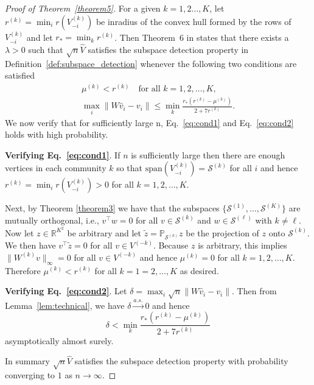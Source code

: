 \documentclass[12pt]{article}
\begin{document}
\begin{proof}[Proof of Theorem~\ref{theorem5}]
For a given $k = 1,2\dots,K$, let $r^{(k)} = \min_{i}r(V_{-i}^{(k)})$ be inradius of the convex hull formed by
the rows of $V_{-i}^{(k)}$ and let $r_* = \min_{k} r^{(k)}$. Then Theorem~6 in
\citet{jmlr-v28-wang13} states that there exists a $\lambda > 0$
such that $\sqrt{n} \hat{V}$ satisfies
the subspace detection property in
Definition~\ref{def:subspace_detection} whenever
the following two conditions are satisfied
\begin{gather}
  \label{eq:cond1}
  \mu^{(k)} < r^{(k)} \quad \text{for all $k = 1,2,\dots,K$}, \\
  \label{eq:cond2}
  \max_{i} \|W \hat{v}_{i} - v_{i}\| \leq \min_{k} \frac{r_*(r^{(k)} -
    \mu^{(k)})}{2 + 7 r^{(k)}}.
\end{gather}
We now verify that for sufficiently large n, Eq.~\eqref{eq:cond1} and Eq.~\eqref{eq:cond2}
holds with high probability.

{\bf Verifying Eq.~\eqref{eq:cond1}}. If $n$ is sufficiently large then
there are enough vertices in each community $k$ so that
$\mathrm{span}(V_{-i}^{(k)}) = \mathcal{S}^{(k)}$ for all $i$ and hence
\(r^{(k)} = \min_{i} r(V_{-i}^{(k)}) > 0\) for
all $k = 1,2,\dots,K$. 

Next, by Theorem \ref{theorem3} we have that the subspaces
$\{\mathcal{S}^{(1)}, \dots, \mathcal{S}^{(K)}\}$
are mutually orthogonal, i.e., $v^{\top} w = 0$ for all $v \in
\mathcal{S}^{(k)}$ and $w \in \mathcal{S}^{(\ell)}$ with $k \not =
\ell$. Now let $z \in \mathbb{R}^{K^2}$ be arbitrary and let
$\tilde{z} = \mathbb{P}_{\mathcal{S}^{(k)}} z$ be the projection of
$z$ onto $\mathcal{S}^{(k)}$. We then have $v^{\top} \tilde{z} =
0$ for all $v \in V^{(-k)}$. Because $z$ is arbitrary, this implies 
$\|W^{(k)} v\|_{\infty} = 0$ for all $v
\in V^{(-k)}$ and hence $\mu^{(k)} = 0$ for all $k
=1,2,\dots,K$. Therefore $\mu^{(k)} < r^{(k)}$ for all $k =
1=2,\dots,K$ as desired.

{\bf Verifying Eq.~\eqref{eq:cond2}}.
Let $\delta = \max_{i} \sqrt{n} \|W
\hat{v}_{i} - v_{i}\|$. Then from Lemma~\ref{lem:technical}, we have
\(\delta \stackrel{a.s.}{\to} 0\) and hence
$$\delta < \min_{k} \frac{r_* (r^{(k)} - \mu^{(k)})}{2 + 7 r^{(k)}}$$
asymptotically almost surely. 

In summary $\sqrt{n} \hat{V}$ satisfies the subspace detection property
with probability converging to $1$ as \(n \to \infty\).
\end{proof}
\end{document}
